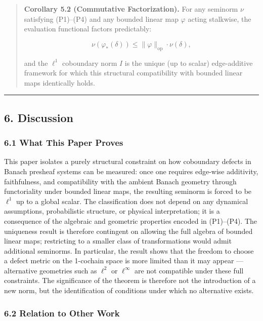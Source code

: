 \documentclass[
]{article}
\begin{document}
\begin{quote}
\textbf{Corollary 5.2 (Commutative Factorization).} For any seminorm
\(\nu\) satisfying (P1)--(P4) and any bounded linear map \(\varphi\)
acting stalkwise, the evaluation functional factors predictably:

\[\nu(\varphi_*(\delta)) \leq \|\varphi\|_{\text{op}} \cdot \nu(\delta),\]

and the \(\ell^1\) coboundary norm \(I\) is the unique (up to scalar)
edge-additive framework for which this structural compatibility with
bounded linear maps identically holds.
\end{quote}

\begin{center}\rule{0.5\linewidth}{0.5pt}\end{center}

\subsection{6. Discussion}\label{discussion}

\subsubsection{6.1 What This Paper Proves}\label{what-this-paper-proves}

This paper isolates a purely structural constraint on how coboundary
defects in Banach presheaf systems can be measured: once one requires
edge-wise additivity, faithfulness, and compatibility with the ambient
Banach geometry through functoriality under bounded linear maps, the
resulting seminorm is forced to be \(\ell^1\) up to a global scalar. The
classification does not depend on any dynamical assumptions,
probabilistic structure, or physical interpretation; it is a consequence
of the algebraic and geometric properties encoded in (P1)--(P4). The
uniqueness result is therefore contingent on allowing the full algebra
of bounded linear maps; restricting to a smaller class of
transformations would admit additional seminorms. In particular, the
result shows that the freedom to choose a defect metric on the 1-cochain
space is more limited than it may appear --- alternative geometries such
as \(\ell^2\) or \(\ell^\infty\) are not compatible under these full
constraints. The significance of the theorem is therefore not the
introduction of a new norm, but the identification of conditions under
which no alternative exists.

\subsubsection{6.2 Relation to Other Work}\label{relation-to-other-work}
\end{document}
